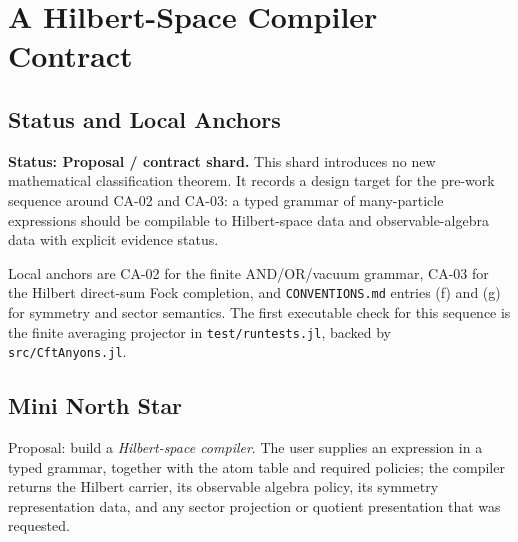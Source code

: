 
\section{A Hilbert-Space Compiler Contract}
\label{sec:hilbert-space-compiler-contract}

\subsection{Status and Local Anchors}

\textbf{Status: Proposal / contract shard.}  This shard introduces no new
mathematical classification theorem.  It records a design target for the
pre-work sequence around CA-02 and CA-03: a typed grammar of many-particle
expressions should be compilable to Hilbert-space data and observable-algebra
data with explicit evidence status.

Local anchors are CA-02 for the finite AND/OR/vacuum grammar, CA-03 for the
Hilbert direct-sum Fock completion, and \texttt{CONVENTIONS.md} entries (f) and
(g) for symmetry and sector semantics.  The first executable check for this
sequence is the finite averaging projector in \texttt{test/runtests.jl}, backed
by \texttt{src/CftAnyons.jl}.

\subsection{Mini North Star}

Proposal: build a \emph{Hilbert-space compiler}.  The user supplies an expression
in a typed grammar, together with the atom table and required policies; the
compiler returns the Hilbert carrier, its observable algebra policy, its symmetry
representation data, and any sector projection or quotient presentation that was
requested.

